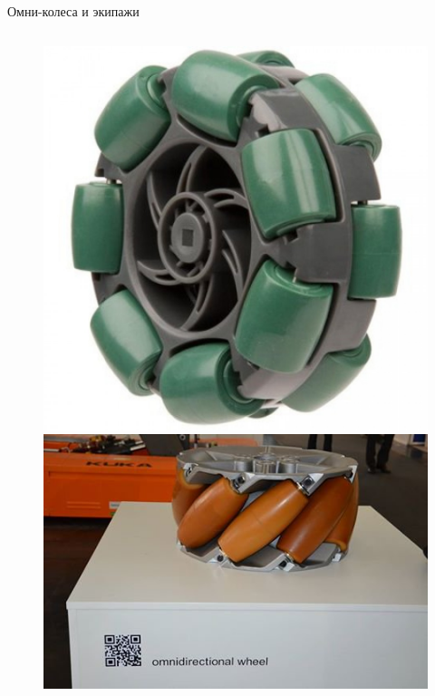 \begin{frame}{Омни-колеса и экипажи}
    \vspace{-5pt}
    \begin{figure}[H]
        \centering
        \begin{columns}
                \centering
                \includegraphics[width=\linewidth]{content/pic/photo/wheel_two_rows.jpg}
                \centering
                \includegraphics[width=\linewidth]{content/pic/photo/wheel_mecanum.jpg}

\end{columns}
\end{figure}
\end{frame}

